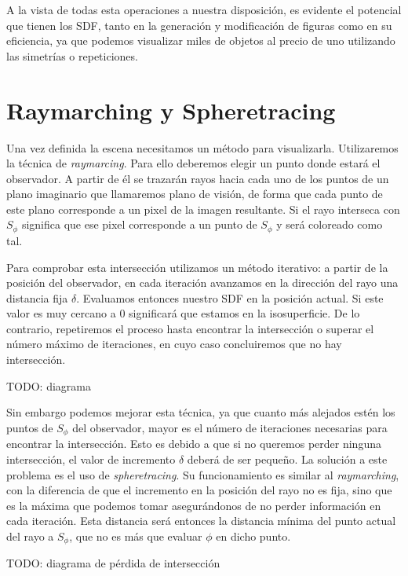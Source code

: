 A la vista de todas esta operaciones a nuestra disposición, es evidente el potencial que tienen los SDF, tanto en la generación y modificación de figuras como en su eficiencia, ya que podemos visualizar miles de objetos al precio de uno utilizando las simetrías o repeticiones.

\section{Raymarching y Spheretracing}
Una vez definida la escena necesitamos un método para visualizarla. Utilizaremos la técnica de \textit{raymarcing}. Para ello deberemos elegir un punto donde estará el observador. A partir de él se trazarán rayos hacia cada uno de los puntos de un plano imaginario que llamaremos plano de visión, de forma que cada punto de este plano corresponde a un pixel de la imagen resultante. Si el rayo interseca con $S_\phi$ significa que ese pixel corresponde a un punto de $S_\phi$ y será coloreado como tal.\newline

Para comprobar esta intersección utilizamos un método iterativo: a partir de la posición del observador, en cada iteración avanzamos en la dirección del rayo una distancia fija $\delta$. Evaluamos entonces nuestro SDF en la posición actual. Si este valor es muy cercano a 0 significará que estamos en la isosuperficie. De lo contrario, repetiremos el proceso hasta encontrar la intersección o superar el número máximo de iteraciones, en cuyo caso concluiremos que no hay intersección.\newline

TODO: diagrama

Sin embargo podemos mejorar esta técnica, ya que cuanto más alejados estén los puntos de $S_\phi$ del observador, mayor es el número de iteraciones necesarias para encontrar la intersección. Esto es debido a que si no queremos perder ninguna intersección, el valor de incremento $\delta$ deberá de ser pequeño. La solución a este problema es el uso de \textit{spheretracing}. Su funcionamiento es similar al \textit{raymarching}, con la diferencia de que el incremento en la posición del rayo no es fija, sino que es la máxima que podemos tomar asegurándonos de no perder información en cada iteración. Esta distancia será entonces la distancia mínima del punto actual del rayo a $S_\phi$, que no es más que evaluar $\phi$ en dicho punto.\newline

TODO: diagrama de pérdida de intersección

